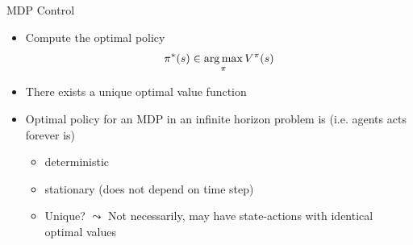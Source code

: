 \documentclass[aspectratio=169]{../latex_main/tntbeamer}  %
\begin{document}
\begin{frame}[c]{MDP Control}

\begin{itemize}
	\item Compute the optimal policy
	$$ \pi^*(s)  \in \operatorname*{arg\,max}_\pi V^\pi(s)$$
	\item There \alert{exists a unique optimal value function}
	\item Optimal policy for an MDP in an infinite horizon problem is \newline (i.e. agents acts forever is)
	\begin{itemize}
		\item  deterministic
		\item stationary (does not depend on time step)
		\item Unique? $\leadsto$ Not necessarily, may have state-actions with identical optimal values
	\end{itemize}
\end{itemize}

\end{frame}
\end{document}
